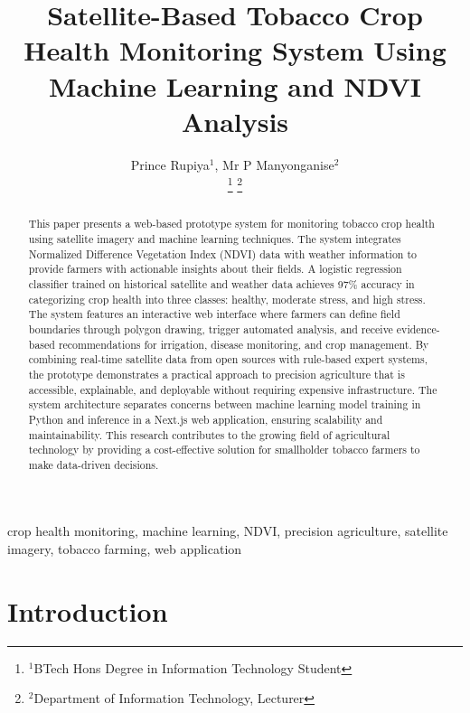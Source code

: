 \documentclass[journal]{IEEEtran}
\begin{document}
\title{Satellite-Based Tobacco Crop Health Monitoring System Using Machine Learning and NDVI Analysis}

\author{Prince Rupiya$^{1}$, Mr P Manyonganise$^{2}$\\
\thanks{$^{1}$BTech Hons Degree in Information Technology Student}
\thanks{$^{2}$Department of Information Technology, Lecturer}}

\maketitle

\begin{abstract}
This paper presents a web-based prototype system for monitoring tobacco crop health using satellite imagery and machine learning techniques. The system integrates Normalized Difference Vegetation Index (NDVI) data with weather information to provide farmers with actionable insights about their fields. A logistic regression classifier trained on historical satellite and weather data achieves 97\% accuracy in categorizing crop health into three classes: healthy, moderate stress, and high stress. The system features an interactive web interface where farmers can define field boundaries through polygon drawing, trigger automated analysis, and receive evidence-based recommendations for irrigation, disease monitoring, and crop management. By combining real-time satellite data from open sources with rule-based expert systems, the prototype demonstrates a practical approach to precision agriculture that is accessible, explainable, and deployable without requiring expensive infrastructure. The system architecture separates concerns between machine learning model training in Python and inference in a Next.js web application, ensuring scalability and maintainability. This research contributes to the growing field of agricultural technology by providing a cost-effective solution for smallholder tobacco farmers to make data-driven decisions.
\end{abstract}

\begin{IEEEkeywords}
crop health monitoring, machine learning, NDVI, precision agriculture, satellite imagery, tobacco farming, web application
\end{IEEEkeywords}

\section{Introduction}
\end{document}
